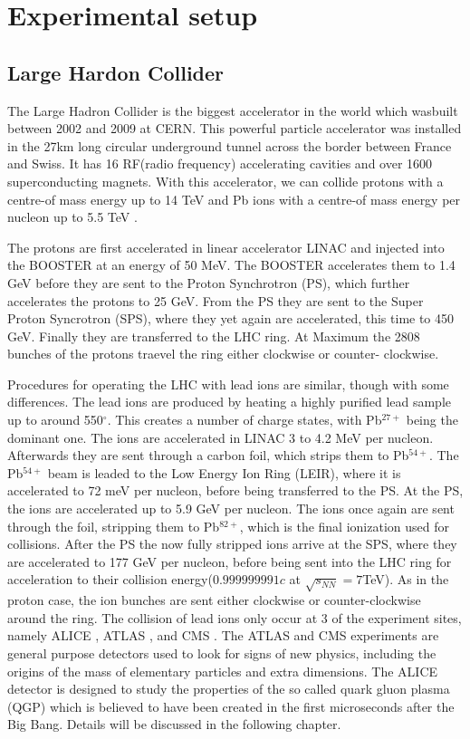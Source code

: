 

\chapter{Experimental setup}
\section{Large Hardon Collider}

The Large Hadron Collider is the biggest accelerator in the world which wasbuilt between 2002 and 2009 at CERN. This powerful  particle accelerator was installed in the 27km long circular underground tunnel across the border between France and Swiss. It has 16 RF(radio frequency) accelerating cavities and over 1600 superconducting magnets. With this accelerator, we can collide protons with a centre-of mass energy up to 14 TeV and Pb ions with a centre-of mass energy per nucleon up to 5.5 TeV \cite{lhc}.

The protons are first accelerated in linear accelerator LINAC and injected into the BOOSTER at an energy of 50 MeV. The BOOSTER accelerates them to 1.4 GeV before they are sent to the Proton Synchrotron (PS), which further accelerates the protons to 25 GeV.  From the PS they are sent to the Super Proton Syncrotron (SPS), where they yet again are accelerated, this time to 450 GeV. Finally they are transferred to the LHC ring. At Maximum the 2808 bunches of the protons traevel the ring either clockwise or counter- clockwise.

Procedures for operating the LHC with lead ions are similar, though with some differences. The lead ions are produced by heating a highly purified lead sample up to around 550$^\circ$. This creates a number of charge states, with Pb$^{27+}$ being the dominant one. The ions are accelerated in LINAC 3 to 4.2 MeV per nucleon. Afterwards they are sent through a carbon foil, which strips them to Pb$^{54+}$.  The Pb$^{54+}$ beam is leaded to the Low Energy Ion Ring (LEIR), where it is accelerated to 72 meV per nucleon, before being transferred to the PS. At the PS, the ions are accelerated up to 5.9 GeV per nucleon. The ions once again are sent through the foil, stripping them to Pb$^{82+}$, which is the final ionization used for collisions. After the PS the now fully stripped ions arrive at the SPS, where they are accelerated to 177 GeV per nucleon, before being sent into the LHC ring for acceleration to their collision energy($0.999999991c$ at $\sqrt{s_{NN}}=7$TeV). As in the proton case, the ion bunches are sent either clockwise or counter-clockwise around the ring. The collision of lead ions only occur at 3 of the experiment sites, namely ALICE \cite{alice}, ATLAS \cite{atlas}, and CMS \cite{cms}. The ATLAS and CMS experiments are general purpose detectors used to look for signs of new physics, including the origins of the mass of elementary particles and extra dimensions. The ALICE detector is designed to study the properties of the so called quark gluon plasma (QGP) which is believed to have been created in the first microseconds after the Big Bang. Details will be discussed in the following chapter.


